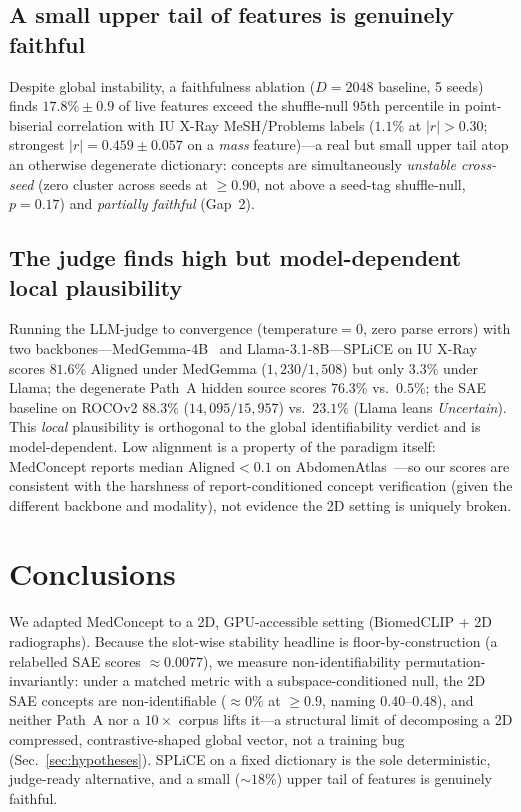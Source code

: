 \documentclass[sigconf, nonacm]{acmart}
\begin{document}
\subsection{A small upper tail of features is genuinely faithful}
Despite global instability, a faithfulness ablation ($D{=}2048$ baseline, 5 seeds) finds $17.8\%\pm0.9$ of live features exceed the shuffle-null $95$th percentile in point-biserial correlation with IU X-Ray MeSH/Problems labels ($1.1\%$ at $|r|>0.30$; strongest $|r|{=}0.459\pm0.057$ on a \emph{mass} feature)---a real but small upper tail atop an otherwise degenerate dictionary: concepts are simultaneously \emph{unstable cross-seed} (zero cluster across seeds at ${\geq}0.90$, not above a seed-tag shuffle-null, $p{=}0.17$) and \emph{partially faithful} (Gap~2).

\subsection{The judge finds high but model-dependent local plausibility}
\label{sec:judge}
Running the LLM-judge to convergence ($\mathrm{temperature}{=}0$, zero parse errors) with two backbones---MedGemma-4B~\cite{sellergren2025medgemma} and Llama-3.1-8B---SPLiCE on IU X-Ray scores $81.6\%$ Aligned under MedGemma ($1{,}230/1{,}508$) but only $3.3\%$ under Llama; the degenerate Path~A hidden source scores $76.3\%$ vs.\ $0.5\%$; the SAE baseline on ROCOv2 $88.3\%$ ($14{,}095/15{,}957$) vs.\ $23.1\%$ (Llama leans \emph{Uncertain}). This \emph{local} plausibility is orthogonal to the global identifiability verdict and is model-dependent. Low alignment is a property of the paradigm itself: MedConcept reports median Aligned$<0.1$ on AbdomenAtlas~\cite{haque2026medconcept}---so our scores are consistent with the harshness of report-conditioned concept verification (given the different backbone and modality), not evidence the 2D setting is uniquely broken.

\section{Conclusions}
We adapted MedConcept to a 2D, GPU-accessible setting (BiomedCLIP + 2D radiographs). Because the slot-wise stability headline is floor-by-construction (a relabelled SAE scores ${\approx}0.0077$), we measure non-identifiability permutation-invariantly: under a matched metric with a subspace-conditioned null, the 2D SAE concepts are non-identifiable (${\approx}0\%$ at ${\geq}0.9$, naming $0.40$--$0.48$), and neither Path~A nor a $10{\times}$ corpus lifts it---a structural limit of decomposing a 2D compressed, contrastive-shaped global vector, not a training bug (Sec.~\ref{sec:hypotheses}). SPLiCE on a fixed dictionary is the sole deterministic, judge-ready alternative, and a small (${\sim}18\%$) upper tail of features is genuinely faithful.
\end{document}
